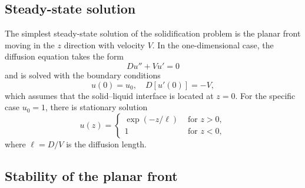 \documentclass{article}
\begin{document}
\subsection{Steady-state solution}

The simplest steady-state solution of the solidification problem is the planar front
moving in the $z$ direction with velocity $V$.
In the one-dimensional case, the diffusion equation takes the form
\begin{equation}\label{eq:problem_1d}
    Du'' + Vu' = 0
\end{equation}
and is solved with the boundary conditions
\begin{equation}\label{eq:bc_1d}
    u(0) = u_0, \quad D[u'(0)] = -V,
\end{equation}
which assumes that the solid--liquid interface is located at $z=0$.
For the specific case $u_0=1$, there is stationary solution
\begin{equation}\label{eq:solution_1d}
    u(z) = \begin{cases}
        \exp(-z/\ell) & \text{ for } z>0, \\
        1 & \text{ for } z<0,
    \end{cases}
\end{equation}
where $\ell=D/V$ is the diffusion length.

\subsection{Stability of the planar front}
\end{document}
